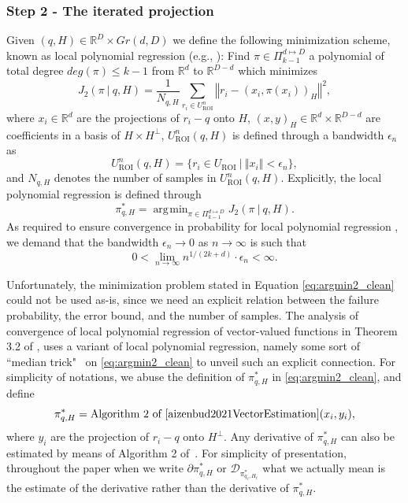 \documentclass[12pt]{article}
\theoremstyle{remark}
\newcommand{\RR}{\mathbb{R}}
\newcommand{\DD}{\mathcal{D}}
\newcommand{\norm}[1]{\left\Vert #1 \right\Vert}
\DeclareMathOperator*{\argmin}{\arg\!\min}
\begin{document}
\subsubsection{Step 2 - The iterated projection}
Given $(q, H)\in \RR^D\times Gr(d,D)$ we define the following minimization scheme, known as local polynomial regression (e.g., \cite{cleveland1979robust,mclain1976two}):
Find $\pi\in \Pi_{k-1}^{d\mapsto D}$ a polynomial of total degree $deg(\pi)\leq k-1$ from $\RR^d$ to $\RR^{D-d}$ which minimizes
\begin{equation}\label{eq:Step2_clean}
	J_2(\pi ~|~ q, H) = \frac{1}{N_{q, H}}\sum_{r_i \in U_{\textrm{ROI}}^n} \norm{r_i - (x_i, \pi(x_i))_H}^2
	,\end{equation}
where $x_i\in \RR^d$ are the projections of $r_i - q$ onto $H$, $(x, y)_H\in \RR^d\times\RR^{D-d}$ are coefficients in a basis of $H\times H^\perp$, $U_{\textrm{ROI}}^n(q,H)$ is defined through a bandwidth $\epsilon_n$ as
\begin{equation}\label{eq:ROI_ell_clean}
	U_{\textrm{ROI}}^n(q,H) = {\{r_i\in U_\textrm{ROI}~|~\norm{x_i}<\epsilon_n\}}
	,\end{equation}
and $N_{q, H}$ denotes the number of samples in $U_{\textrm{ROI}}^n(q, H)$.
Explicitly, the local polynomial regression is defined through
\begin{equation}\label{eq:argmin2_clean}
	\pi^*_{q, H} = \argmin_{\pi\in \Pi_{k-1}^{d\mapsto D}} J_2(\pi ~|~ q, H)
	.\end{equation}
As required to ensure convergence in probability for local polynomial regression \cite{aizenbud2021VectorEstimation,stone1980optimal}, we demand that the bandwidth $\epsilon_n\to 0$ as $n\to\infty$ is such that 
\begin{equation}\label{eq:bandwidthDecay_clean}
	0<\lim_{n\rightarrow\infty}n^{1/(2k+d)}\cdot \epsilon_n < \infty
	.\end{equation}

Unfortunately, the minimization problem stated in Equation \eqref{eq:argmin2_clean} could not be used as-is, since we need an explicit relation between the failure probability, the error bound, and the number of samples. 
The analysis of convergence of local polynomial regression of vector-valued functions in Theorem 3.2 of \cite{aizenbud2021VectorEstimation}, uses a variant of local polynomial regression, namely some sort of ``median trick"~\cite{alon1999space} on \eqref{eq:argmin2_clean} to unveil such an explicit connection. 
For simplicity of notations, we abuse the definition of $ \pi^*_{q, H}$ in \eqref{eq:argmin2_clean}, and define
\begin{equation}\label{eq:pi_star_median_trick}
	\pi^*_{q, H} = \mbox{Algorithm 2 of \cite{aizenbud2021VectorEstimation}} (x_i,y_i),
\end{equation}
where $y_i$ are the projection of $r_i-q$ onto $H^\perp$. 
Any derivative of $\pi^*_{q, H}$ can also be estimated by means of Algorithm 2 of~\cite{aizenbud2021VectorEstimation}. For simplicity of presentation, throughout the paper when we write $\partial \pi^*_{q, H}$ or $\DD_{\pi^*_{q_\ell,H_{\ell}}}$ what we actually mean is the estimate of the derivative rather than the derivative of $\pi^*_{q, H}$.
\end{document}
